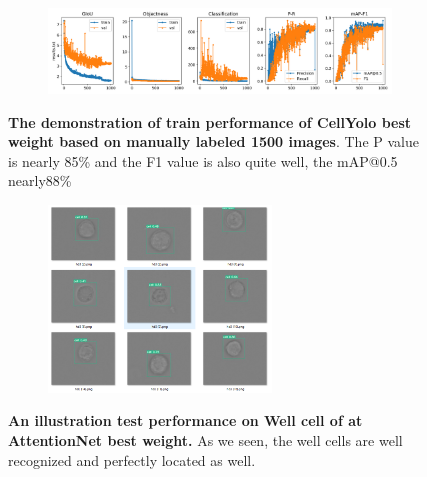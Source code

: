 \begin{figure}[h]
	\begin{center}
		\begin{subfigure}[b]{\textwidth}
		    \centering
			\includegraphics[width=1\textwidth]{thesis-template-master/images/cellyolo best weight based on manually labeled 1500 images.png}
			\label{fig:cellnet}
		\end{subfigure}
	\end{center}
	\caption{\textbf{The demonstration of train performance of CellYolo best weight based on manually labeled 1500 images}. The P value is nearly 85\% and the F1 value is also quite well, the mAP@0.5 nearly88\%}
\end{figure}

\begin{figure}[h]
	\begin{center}
		\begin{subfigure}[b]{\textwidth}
		    \centering
			\includegraphics[width=0.65\textwidth]{thesis-template-master/images/An illustration test performance of CellYolo best weight.png}
			\label{fig:cellnet}
		\end{subfigure}
	\end{center}
	\caption{\textbf{An illustration test performance on Well cell of at AttentionNet best weight.} As we seen, the well cells are well recognized and perfectly located as well.}
\end{figure}



